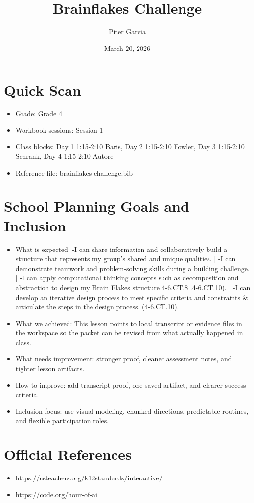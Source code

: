 \documentclass[11pt]{article}
\title{Brainflakes Challenge}
\author{Piter Garcia}
\date{March 20, 2026}
\begin{document}
    \maketitle
    \section*{Quick Scan}
    \begin{itemize}[leftmargin=*]
    \item Grade: Grade 4
    \item Workbook sessions: Session 1
    \item Class blocks: Day 1 1:15-2:10 Baris, Day 2 1:15-2:10 Fowler, Day 3 1:15-2:10 Schrank, Day 4 1:15-2:10 Autore
    \item Reference file: brainflakes-challenge.bib
    \end{itemize}
    \section*{School Planning Goals and Inclusion}
    \begin{itemize}[leftmargin=*]
    \item What is expected: -I can share information and collaboratively build a structure that represents my group's shared and unique qualities. | -I can demonstrate teamwork and problem-solving skills during a building challenge. | -I can apply computational thinking concepts such as decomposition and abstraction to design my Brain Flakes structure 4-6.CT.8 .4-6.CT.10). | -I can develop an iterative design process to meet specific criteria and constraints & articulate the steps in the design process. (4-6.CT.10).
    \item What we achieved: This lesson points to local transcript or evidence files in the workspace so the packet can be revised from what actually happened in class.
    \item What needs improvement: stronger proof, cleaner assessment notes, and tighter lesson artifacts.
    \item How to improve: add transcript proof, one saved artifact, and clearer success criteria.
    \item Inclusion focus: use visual modeling, chunked directions, predictable routines, and flexible participation roles.
    \end{itemize}
    \section*{Official References}
    \begin{itemize}[leftmargin=*]
    \item \url{https://csteachers.org/k12standards/interactive/}
\item \url{https://code.org/hour-of-ai}

    \end{itemize}
    
\end{document}
